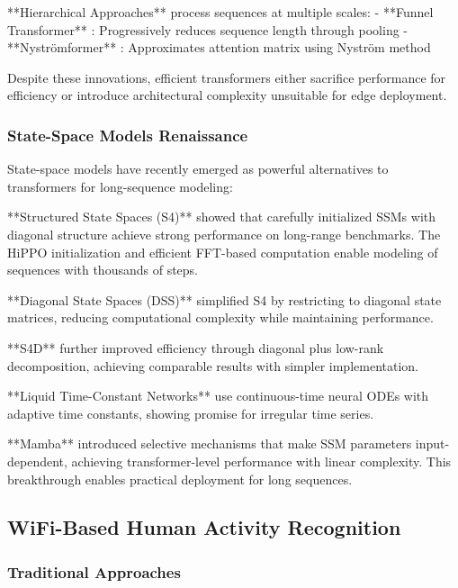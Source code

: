\documentclass[10pt,journal,compsoc]{IEEEtran}
\begin{document}
**Hierarchical Approaches** process sequences at multiple scales:
- **Funnel Transformer** \cite{dai2020funnel}: Progressively reduces sequence length through pooling
- **Nyströmformer** \cite{xiong2021nystromformer}: Approximates attention matrix using Nyström method

Despite these innovations, efficient transformers either sacrifice performance for efficiency or introduce architectural complexity unsuitable for edge deployment.

\subsubsection{State-Space Models Renaissance}

State-space models have recently emerged as powerful alternatives to transformers for long-sequence modeling:

**Structured State Spaces (S4)** \cite{gu2021efficiently} showed that carefully initialized SSMs with diagonal structure achieve strong performance on long-range benchmarks. The HiPPO initialization and efficient FFT-based computation enable modeling of sequences with thousands of steps.

**Diagonal State Spaces (DSS)** \cite{gupta2022dss} simplified S4 by restricting to diagonal state matrices, reducing computational complexity while maintaining performance.

**S4D** \cite{gu2022s4d} further improved efficiency through diagonal plus low-rank decomposition, achieving comparable results with simpler implementation.

**Liquid Time-Constant Networks** \cite{hasani2021liquid} use continuous-time neural ODEs with adaptive time constants, showing promise for irregular time series.

**Mamba** \cite{gu2023mamba} introduced selective mechanisms that make SSM parameters input-dependent, achieving transformer-level performance with linear complexity. This breakthrough enables practical deployment for long sequences.

\subsection{WiFi-Based Human Activity Recognition}

\subsubsection{Traditional Approaches}
\end{document}
